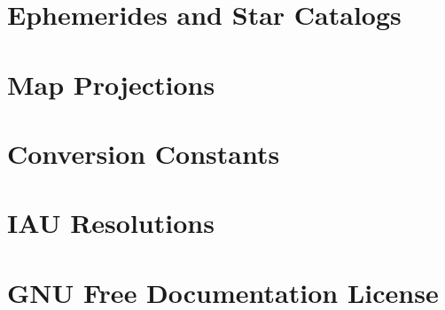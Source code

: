 \documentclass[a4paper,11pt]{scrreport}
\begin{document}
\chapter{Ephemerides and Star Catalogs}\label{EphemeridesAndStarCatalogs}
\chapter{Map Projections}\label{MapProjections}

\nocite{*}%

\appendix
\chapter{Conversion Constants}\label{Conversion Constants}

\chapter{IAU Resolutions}\label{IAU Resolutions}
	
\chapter{GNU Free Documentation License}\label{License}




\printglossary
\end{document}
